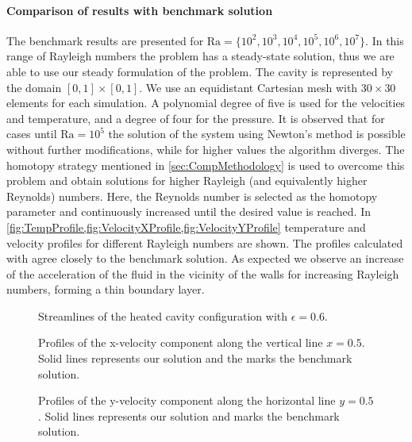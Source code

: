 \paragraph{Comparison of results with benchmark solution}
The benchmark results \cite{vierendeelsBenchmarkSolutionsNatural2003} are presented for $\text{Ra} = \{10^2,10^3,10^4,10^5,10^6,10^7\}$. In this range of Rayleigh numbers the problem has a steady-state solution, thus we are able to use our steady formulation of the problem. The cavity is represented by the domain $[0,1]\times[0,1]$. We use an equidistant Cartesian mesh with $30 \times 30$ elements for each simulation. A polynomial degree of five is used for the velocities and temperature, and a degree of four for the pressure.
It is observed that for cases until  $\text{Ra} = 10^5$ the solution of the system using Newton's method is possible without further modifications, while for higher values the algorithm diverges. The homotopy strategy mentioned in \cref{sec:CompMethodology} is used to overcome this problem and obtain solutions for higher Rayleigh (and equivalently higher Reynolds) numbers. Here, the Reynolds number is selected as the homotopy parameter and continuously increased until the desired value is reached.
In \cref{fig:TempProfile,fig:VelocityXProfile,fig:VelocityYProfile} temperature and velocity profiles for different Rayleigh numbers are shown. The profiles calculated with \BoSSS agree closely to the benchmark solution. As expected we observe
an increase of the acceleration of the fluid in the vicinity of the walls for increasing Rayleigh numbers, forming a thin boundary layer.



\begin{figure}
	\centering
	\pgfplotsset{width=0.45 \textwidth, compat=1.3}
	\caption{Streamlines of the heated cavity configuration with $\epsilon = 0.6$.}\label{fig:HSCStreamlines}
\end{figure}


\begin{figure}[!htb]
	\centering
	\pgfplotsset{width=0.20\textwidth, compat=1.3}
	\caption{ Profiles of the x-velocity component along the vertical line $x=0.5$. Solid lines represents our solution and the marks the benchmark solution. \cite{vierendeelsBenchmarkSolutionsNatural2003}}
	\label{fig:VelocityXProfile}
\end{figure}


\begin{figure}[b!]
	\centering
	\pgfplotsset{width=0.20\textwidth, compat=1.3}
	\caption{ Profiles of the y-velocity component along the horizontal line $y=0.5$. Solid lines represents our solution and marks the benchmark solution. \cite{vierendeelsBenchmarkSolutionsNatural2003}}
	\label{fig:VelocityYProfile}
\end{figure}

